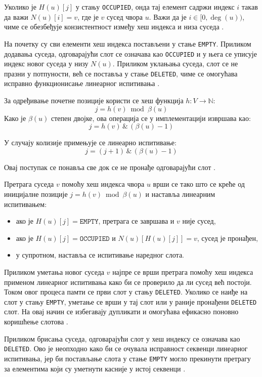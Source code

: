 Уколико је $H(u)[j]$ у стању \texttt{OCCUPIED}, онда тај елемент садржи индекс $i$ такав да важи $N(u)[i] = v$, где је $v$ сусед чвора $u$. Важи да је $i \in [0, \deg(u))$, чиме се обезбеђује конзистентност између хеш индекса и низа суседа \cite{vandergrinten_et_al:LIPIcs.SEA.2022.11}. 

На почетку су сви елементи хеш индекса постављени у стање \texttt{EMPTY}. Приликом додавања суседа, одговарајући слот се означава као \texttt{OCCUPIED} и у њега се уписује индекс новог суседа у низу $N(u)$. Приликом уклањања суседа, слот се не празни у потпуности, већ се поставља у стање \texttt{DELETED}, чиме се омогућава исправно функционисање линеарног испитивања \cite{vandergrinten_et_al:LIPIcs.SEA.2022.11}.

За одређивање почетне позиције користи се хеш функција $h : V \rightarrow \mathbb{N}$:
\[
j = h(v) \bmod \beta(u)
\]
Како је $\beta(u)$ степен двојке, ова операција се у имплементацији извршава као:
\[
j = h(v) \,\&\, (\beta(u) - 1)
\]

У случају колизије примењује се линеарно испитивање:
\[
j = (j + 1) \,\&\, (\beta(u) - 1)
\]

Овај поступак се понавља све док се не пронађе одговарајући слот \cite{vandergrinten_et_al:LIPIcs.SEA.2022.11}.

Претрага суседа $v$ помоћу хеш индекса чвора $u$ врши се тако што се креће од иницијалне позиције $j = h(v) \bmod \beta(u)$ и наставља линеарним испитивањем:
\begin{itemize}
    \item ако је $H(u)[j] = \texttt{EMPTY}$, претрага се завршава и $v$ није сусед,
    \item ако је $H(u)[j] = \texttt{OCCUPIED}$ и $N(u)[H(u)[j]] = v$, сусед је пронађен,
    \item у супротном, наставља се испитивање наредног слота.
\end{itemize}

Приликом уметања новог суседа $v$ најпре се врши претрага помоћу хеш индекса применом линеарног испитивања како би се проверило да ли сусед већ постоји. Током овог процеса памти се први слот у стању \texttt{DELETED}. Уколико се наиђе на слот у стању \texttt{EMPTY}, уметање се врши у тај слот или у раније пронађени \texttt{DELETED} слот. На овај начин се избегавају дупликати и омогућава ефикасно поновно коришћење слотова \cite{vandergrinten_et_al:LIPIcs.SEA.2022.11}.

Приликом брисања суседа, одговарајући слот у хеш индексу се означава као \texttt{DELETED}. Ово је неопходно како би се очувала исправност секвенци линеарног испитивања, јер би постављање слота у стање \texttt{EMPTY} могло прекинути претрагу за елементима који су уметнути касније у истој секвенци \cite{vandergrinten_et_al:LIPIcs.SEA.2022.11}.

